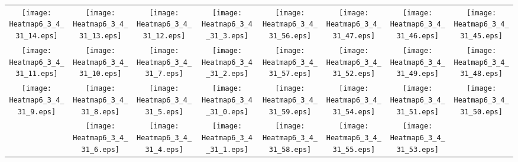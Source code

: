 \documentclass{standalone}
\begin{document}
\begin{tabular}{ *8{c} }
\texttt{[image: Heatmap6\_3\_4\_31\_14.eps]} & \texttt{[image: Heatmap6\_3\_4\_31\_13.eps]} & \texttt{[image: Heatmap6\_3\_4\_31\_12.eps]} & \texttt{[image: Heatmap6\_3\_4\_31\_3.eps]} & \texttt{[image: Heatmap6\_3\_4\_31\_56.eps]} & \texttt{[image: Heatmap6\_3\_4\_31\_47.eps]} & \texttt{[image: Heatmap6\_3\_4\_31\_46.eps]} & \texttt{[image: Heatmap6\_3\_4\_31\_45.eps]} \\
\texttt{[image: Heatmap6\_3\_4\_31\_11.eps]} & \texttt{[image: Heatmap6\_3\_4\_31\_10.eps]} & \texttt{[image: Heatmap6\_3\_4\_31\_7.eps]} & \texttt{[image: Heatmap6\_3\_4\_31\_2.eps]} & \texttt{[image: Heatmap6\_3\_4\_31\_57.eps]} & \texttt{[image: Heatmap6\_3\_4\_31\_52.eps]} & \texttt{[image: Heatmap6\_3\_4\_31\_49.eps]} & \texttt{[image: Heatmap6\_3\_4\_31\_48.eps]} \\
\texttt{[image: Heatmap6\_3\_4\_31\_9.eps]} & \texttt{[image: Heatmap6\_3\_4\_31\_8.eps]} & \texttt{[image: Heatmap6\_3\_4\_31\_5.eps]} & \texttt{[image: Heatmap6\_3\_4\_31\_0.eps]} & \texttt{[image: Heatmap6\_3\_4\_31\_59.eps]} & \texttt{[image: Heatmap6\_3\_4\_31\_54.eps]} & \texttt{[image: Heatmap6\_3\_4\_31\_51.eps]} & \texttt{[image: Heatmap6\_3\_4\_31\_50.eps]} \\
 & \texttt{[image: Heatmap6\_3\_4\_31\_6.eps]} & \texttt{[image: Heatmap6\_3\_4\_31\_4.eps]} & \texttt{[image: Heatmap6\_3\_4\_31\_1.eps]} & \texttt{[image: Heatmap6\_3\_4\_31\_58.eps]} & \texttt{[image: Heatmap6\_3\_4\_31\_55.eps]} & \texttt{[image: Heatmap6\_3\_4\_31\_53.eps]} &  
\end{tabular}
\end{document}
